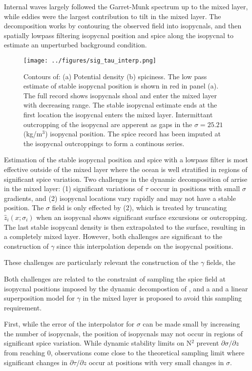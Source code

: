 \documentclass[preprint]{JASA}
\begin{document}
 Internal waves largely followed the Garret-Munk spectrum up to the mixed layer, while eddies were the largest contribution to tilt in the mixed layer.  The decomposition works by contouring the observed field into isopycnals, and then spatially lowpass filtering isopycnal position and spice along the isopycnal to estimate an unperturbed background condition.

\begin{figure}
\texttt{[image: ../figures/sig\_tau\_interp.png]}
    \caption{\label{fig:cntrs}{Contours of: (a) Potential density (b) spiciness. The low pass estimate of stable isopycnal position is shown in red in panel (a). The full record shows isopycnals shoal and enter the mixed layer with decreasing range. The stable isopycnal estimate ends at the first location the isopycnal enters the mixed layer. Intermittant outcropping of the isopycnal are apperent as gaps in the $\sigma=25.21$ (kg/m$^3$) isopycnal position. The spice record has been imputed at the isopycnal outcroppings to form a continous series.}}
\end{figure}

Estimation of the stable isopycnal position and spice with a lowpass filter is most effective outside of the mixed layer where the ocean is well stratified in regions of significant spice variation. Two challenges in the dynamic decomposition of \cite{dzieciuch2004} arrise in the mixed layer: (1) significant variations of $\tau$ occcur in positions with small $\sigma$ gradients, and (2) isopycnal locations vary rapidly and may not have a stable position. The $\sigma$ field is only effected by (2), which is treated by truncating $\hat{z}_i(x; \sigma_i)$ when an isopycnal shows significant surface excursions or outcropping. The last stable isopycanl density is then extrapolated to the surface, resulting in a completely mixed layer. However, both challenges are significant to the construction of $\gamma$ since this interpolation depends on the isopycnal positions.

These challenges are particularly relevant the construction of the $\gamma$ fields, the 

Both challenges are related to the constraint of sampling the spice field at isopycnal positions imposed by the dynamic decompostion of \cite{dzieciuch2004}, and a and a linear superposition model for $\gamma$ in the mixed layer is proposed to avoid this sampling requirement.

First, while the error of the interpolator for $\sigma$ can be made small by increasing the number of isopycnals, the position of isopycnals may not occur in regions of significant spice variation. While dynamic stability limits on N$^2$ prevent $\partial \sigma / \partial z$ from reaching 0, observations come close to the theoretical sampling limit where significant changes in $\partial \tau / \partial z$ occur at positions with very small changes in $\sigma$.
\end{document}
